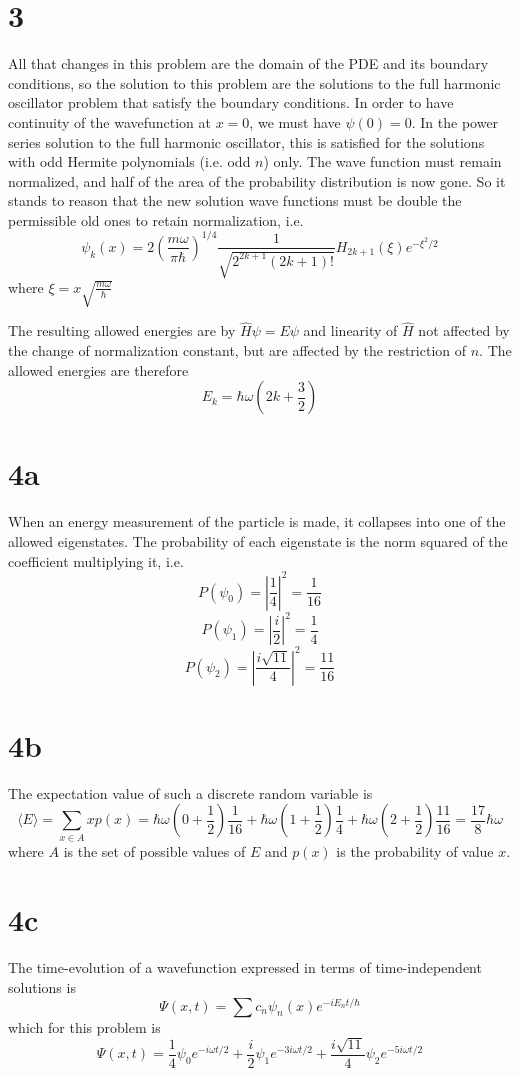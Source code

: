 \documentclass{article}
\begin{document}
\section*{3}
All that changes in this problem are the domain of the PDE and its boundary conditions, so the solution to this problem are the solutions to the full harmonic oscillator problem that satisfy the boundary conditions.
In order to have continuity of the wavefunction at $x=0$, we must have $\psi(0)=0$. In the power series solution to the full harmonic oscillator, this is satisfied for the solutions with odd Hermite polynomials (i.e. odd $n$) only. The wave function must remain normalized, and half of the area of the probability distribution is now gone. So it stands to reason that the new solution wave functions must be double the permissible old ones to retain normalization, i.e.
\[\psi_{k}(x)=2\left( \frac{m\omega}{\pi\hbar} \right)^{1/4}\frac{1}{\sqrt{2^{2k+1}(2k+1)!}}H_{2k+1}(\xi)e^{-\xi^{2}/2}\]
where $\xi =x\sqrt{\frac{m\omega}{\hbar}}$

The resulting allowed energies are by $\hat{H}\psi=E\psi$ and linearity of $\hat{H}$ not affected by the change of normalization constant, but are affected by the restriction of $n$. The allowed energies are therefore
\[E_{k}=\hbar\omega\left( 2k+\frac{3}{2} \right)\]

\section*{4a}
When an energy measurement of the particle is made, it collapses into one of the allowed eigenstates.
The probability of each eigenstate is the norm squared of the coefficient multiplying it, i.e.
\[P(\psi_{0})=\left|\frac{1}{4}\right|^{2}=\frac{1}{16}\]
\[P(\psi_{1})=\left|\frac{i}{2}\right|^{2}=\frac{1}{4}\]
\[P(\psi_{2})=\left|\frac{i\sqrt{11}}{4}\right|^{2}=\frac{11}{16}\]

\section*{4b}
The expectation value of such a discrete random variable is
\[\langle E \rangle=\sum_{x\in A}xp(x)=\hbar\omega(0+\frac{1}{2})\frac{1}{16}+\hbar\omega(1+\frac{1}{2})\frac{1}{4}+\hbar\omega(2+\frac{1}{2})\frac{11}{16}=\frac{17}{8}\hbar\omega\]
where $A$ is the set of possible values of $E$ and $p(x)$ is the probability of value $x$.

\section*{4c}
The time-evolution of a wavefunction expressed in terms of time-independent solutions is
\[\Psi(x,t)=\sum c_{n}\psi_{n}(x)e^{-iE_{n}t/\hbar}\]
which for this problem is
\[\Psi(x,t)=\frac{1}{4}\psi_{0}e^{-i\omega t/2}+\frac{i}{2}\psi_{1}e^{-3i\omega t/2}+\frac{i\sqrt{11}}{4}\psi_{2}e^{-5i\omega t/2}\]
\end{document}
